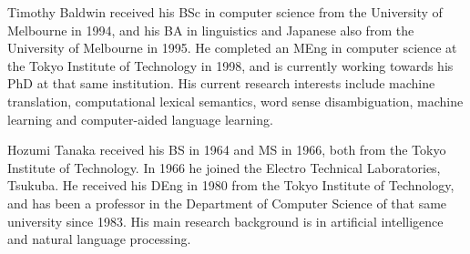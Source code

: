 \begin{biography}

\vspace*{1cm}

 { Timothy Baldwin received his BSc in
  computer science from the University of Melbourne in 1994, and his BA
  in linguistics and Japanese also from the University of Melbourne in
  1995. He completed an MEng in computer science at the Tokyo Institute
  of Technology in 1998, and is currently working towards his PhD at
  that same institution. His current research interests include machine
  translation, computational lexical semantics, word sense
  disambiguation, machine learning and computer-aided language learning.
  }

 { Hozumi Tanaka received his BS in 1964 and MS
  in 1966, both from the Tokyo Institute of Technology.  In 1966 he
  joined the Electro Technical Laboratories, Tsukuba.  He received his
  DEng in 1980 from the Tokyo Institute of Technology, and has been a
  professor in the Department of Computer Science of that same
  university since 1983. His main research background is in artificial
  intelligence and natural language processing.  }



\end{biography}






